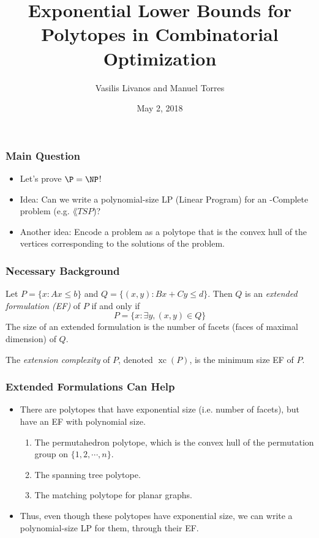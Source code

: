 \documentclass{beamer}
\author[Livanos, Torres]{Vasilis Livanos and Manuel Torres}
\title[Exp. Lower Bounds for Polytopes]{Exponential Lower Bounds for Polytopes in Combinatorial Optimization}
\institute[UIUC]{University of Illinois at Urbana-Champaign}
\date{May 2, 2018}
\newcommand{\xc}{\operatorname{xc}}
\begin{document}
\begin{frame}
\titlepage
\end{frame}


\begin{frame}
\frametitle{Main Question}

\pause
\begin{itemize}
\item Let's prove $\P = \NP$!
\pause
\item Idea: Can we write a polynomial-size LP (Linear Program) for an \NP-Complete problem (e.g. $\lang{TSP}$)?
\pause
\item Another idea: Encode a problem as a polytope that is the convex hull of the vertices corresponding to the solutions of the problem.
\end{itemize}
\end{frame}


\begin{frame}
\frametitle{Necessary Background}

\pause
\begin{definition}
Let $P = \{x : Ax \leq b\}$ and $Q = \{(x,y) : Bx + Cy \leq d\}$. Then $Q$ is an \emph{extended formulation (EF)} of $P$ if and only if
\[
P = \{x : \exists y , (x,y) \in Q\}
\]
The size of an extended formulation is the number of facets (faces of maximal dimension) of $Q$.
\end{definition}

\pause
\begin{definition}
The \emph{extension complexity} of $P$, denoted $\xc(P)$, is the minimum size EF of $P$.
\end{definition}

\end{frame}


\begin{frame}
\frametitle{Extended Formulations Can Help}

\pause
\begin{itemize}
\item There are polytopes that have exponential size (i.e. number of facets), but have an EF with polynomial size.
\pause
\begin{enumerate}
\item The permutahedron polytope, which is the convex hull of the permutation group on $\{1, 2, \cdots, n\}$.
\pause
\item The spanning tree polytope.
\pause
\item The matching polytope for planar graphs.
\end{enumerate}
\pause
\item Thus, even though these polytopes have exponential size, we can write a polynomial-size LP for them, through their EF.
\end{itemize}
\end{frame}
\end{document}
